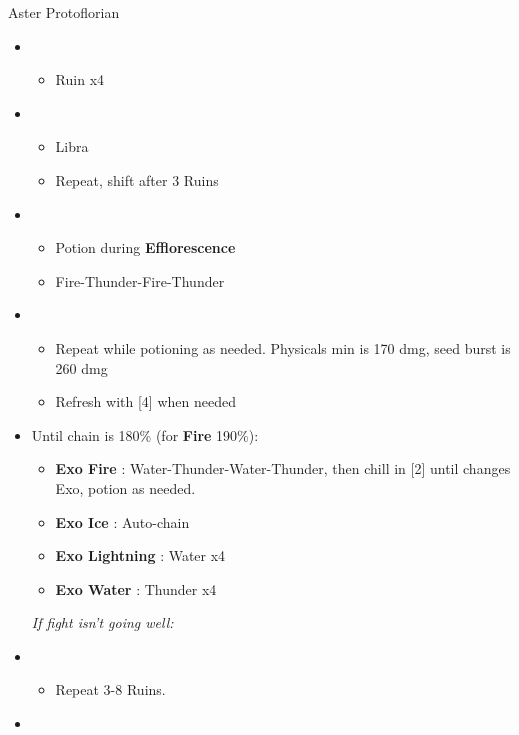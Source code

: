 \begin{battle}[1:43]{Aster Protoflorian}
	\begin{multicols}{2}
		\begin{itemize}
			\item \first
			      \begin{itemize}
				      \item Ruin x4
			      \end{itemize}
			\item \third
			      \begin{itemize}
				      \item Libra
				      \item Repeat, shift after 3 Ruins
			      \end{itemize}
			\item \fourth
			      \begin{itemize}
				      \item Potion during \textbf{Efflorescence}
				      \item Fire-Thunder-Fire-Thunder
			      \end{itemize}
			\item \fifth
			      \begin{itemize}
				      \item Repeat while potioning as needed. Physicals min is 170 dmg, seed burst is 260 dmg
				      \item Refresh with [4] when needed
			      \end{itemize}
			\item Until chain is 180\% (for \textbf{Fire} 190\%):
			      \begin{itemize}
				      \item \textbf{Exo Fire} : Water-Thunder-Water-Thunder, then chill in [2] until changes Exo, potion as needed.
				      \item \textbf{Exo Ice} : Auto-chain
				      \item \textbf{Exo Lightning} : Water x4
				      \item \textbf{Exo Water} : Thunder x4
			      \end{itemize}
			      {\it If fight isn't going well:}
			\item \first
			      \begin{itemize}
				      \item Repeat 3-8 Ruins.
			      \end{itemize}
			      \columnbreak
			\item \fourth
			      \begin{itemize}

\end{itemize}
\end{itemize}
\end{multicols}
\end{battle}
